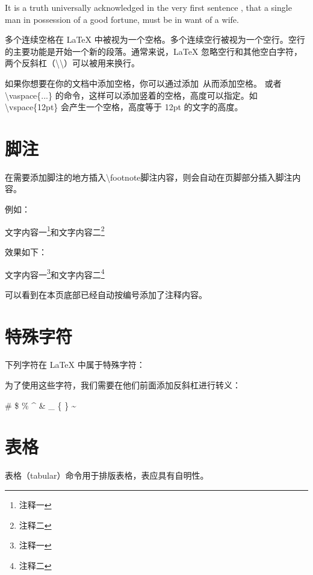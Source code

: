 It is a truth universally acknowledged %
in the very first sentence , that a single man in possession of a good fortune,
must be in want of a wife.

多个连续空格在 LaTeX 中被视为一个空格。多个连续空行被视为一个空行。空行的主要功能是开始一个新的段落。通常来说，LaTeX 忽略空行和其他空白字符，两个反斜杠（\textbackslash\textbackslash）可以被用来换行。

如果你想要在你的文档中添加空格，你可以通过添加~从而添加空格。
或者 \textbackslash vaspace\{...\} 的命令，这样可以添加竖着的空格，高度可以指定。如 \textbackslash vspace\{12pt\} 会产生一个空格，高度等于 12pt 的文字的高度。

\section{脚注}

在需要添加脚注的地方插入\textbackslash footnote{脚注内容}，则会自动在页脚部分插入脚注内容。

例如：

\begin{python}
文字内容一\footnote{注释一}和文字内容二\footnote{注释二}
\end{python}

效果如下：

文字内容一\footnote{注释一}和文字内容二\footnote{注释二}

可以看到在本页底部已经自动按编号添加了注释内容。

\section{特殊字符}

下列字符在 LaTeX 中属于特殊字符：

\begin{python}
#
$
%
^
&
_
{
}
~
\
\end{python}

为了使用这些字符，我们需要在他们前面添加反斜杠进行转义：

\begin{python}
\#
\$
\%
\^{}
\&
\_
\{
\}
\~{}
\end{python}

\section{表格}

表格（tabular）命令用于排版表格，表应具有自明性。

